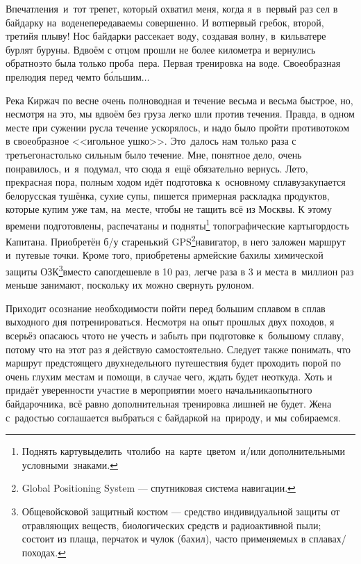 Впечатления~и~тот трепет, который охватил меня, когда я~в~первый раз сел в байдарку на~воде\mdash непередаваемы совершенно. И вот\mdash первый гребок, второй, третий\mdash я плыву! Нос байдарки рассекает воду, создавая волну, в~кильватере бурлят буруны. Вдвоём с отцом прошли не более километра и вернулись обратно\mdash это была только проба~пера. Первая тренировка на воде. Своеобразная прелюдия перед чем\sdash то б\'{о}льшим$\ldots$
 
Река Киржач по весне очень полноводная и течение весьма и весьма быстрое, но, несмотря на это, мы вдвоём без груза легко шли против течения. Правда, в одном месте при сужении русла течение ускорялось, и надо было пройти противотоком в своеобразное <<игольное ушко>>. Это~далось нам только раза с третьего\mdash настолько сильным было течение. Мне, понятное дело, очень понравилось, и~я~подумал, что сюда я~ещё обязательно вернусь. 
\newpage
Лето, прекрасная пора, полным ходом идёт подготовка к~основному сплаву\mdash закупается белорусская тушёнка, сухие супы, пишется примерная раскладка продуктов, которые купим уже там, на~месте, чтобы не тащить всё из Москвы. К этому времени подготовлены, распечатаны и подняты\footnote[1]{Поднять карту\mdash выделить что\sdash либо на карте цветом и/или дополнительными условными знаками.} топографические карты\mdash гордость Капитана. Приобретён б/у старенький GPS\footnote[2]{Global Positioning System --- спутниковая система навигации.}\sdash навигатор, в него заложен маршрут и~путевые точки. Кроме того, приобретены армейские бахилы химической защиты ОЗК\footnote[3]{Общевойсковой защитный костюм --- средство индивидуальной защиты от отравляющих веществ, биологических средств и радиоактивной пыли; состоит из плаща, перчаток и чулок (бахил), часто применяемых в сплавах/походах.}\mdash вместо сапог\mdash дешевле в 10 раз, легче раза в 3 и места в~миллион раз меньше занимают, поскольку их можно свернуть рулоном.

Приходит осознание необходимости пойти перед большим сплавом в сплав выходного дня потренироваться. Несмотря на опыт прошлых двух походов, я всерьёз опасаюсь что\sdash то не учесть и забыть при подготовке к~большому сплаву, потому что на этот раз я действую самостоятельно. Следует также понимать, что маршрут предстоящего двухнедельного путешествия будет проходить порой по очень глухим местам и помощи, в случае чего, ждать будет неоткуда. Хоть и придаёт уверенности участие в мероприятии моего начальника\mdash опытного байдарочника, всё равно дополнительная тренировка лишней не будет. Жена с~радостью соглашается выбраться с байдаркой на~природу, и мы собираемся.

